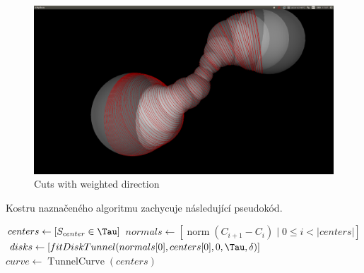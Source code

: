 \begin{figure}[ht]
    \centering
    \includegraphics[width=\textwidth]{img/weighted_dir.png}
    \caption{Cuts with weighted direction}
  \centering
  \label{fig:weighted_dir}
\end{figure}

Kostru naznačeného algoritmu zachycuje následující pseudokód.

\begin{algorithm}
\begin{algorithmic}

    \State $ centers \gets [ S_{center} \in \Tau ] $
    \State $ normals \gets [ \operatorname{norm}(C_{i + 1} - C_{i}) \mid 0 \leq i < |centers| ] $
    \State $ disks \gets   [fitDiskTunnel(normals[0], centers[0], 0, \Tau, \delta)] $
    \State $ curve \gets \operatorname{TunnelCurve}(centers) $
\EndFunction

\end{algorithmic}
\end{algorithm}



